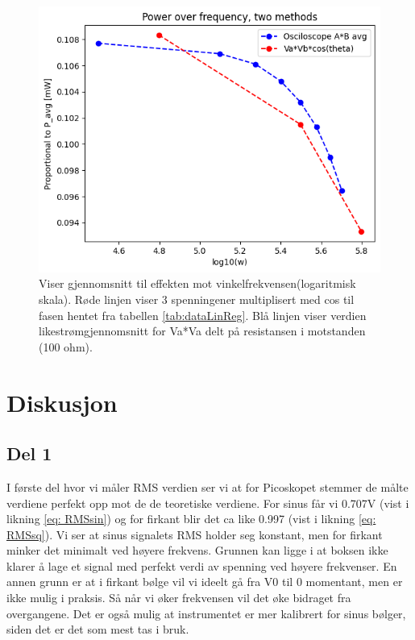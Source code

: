 \documentclass[norsk,a4paper,12pt]{article}
\begin{document}
\begin{figure}[htbp]
    \centering
    \includegraphics[width=1\textwidth]{Figs/effektavsettning.png}
    \caption{Viser gjennomsnitt til effekten mot vinkelfrekvensen(logaritmisk skala). Røde linjen viser 3 spenningener multiplisert med cos til fasen hentet fra tabellen \ref{tab:dataLinReg}. Blå linjen viser verdien likestrømgjennomsnitt for Va*Va delt på resistansen i motstanden (100 ohm).}
    \label{fig:effekt}
\end{figure}



\section{Diskusjon}
\subsection{Del 1}
I første del hvor vi måler RMS verdien ser vi at for Picoskopet stemmer de målte verdiene perfekt opp mot de de teoretiske verdiene. For sinus får vi 0.707V (vist i likning \ref{eq: RMSsin}) og for firkant blir det ca like 0.997 (vist i likning \ref{eq: RMSsq}). Vi ser at sinus signalets RMS holder seg konstant, men for firkant minker det minimalt ved høyere frekvens. Grunnen kan ligge i at boksen ikke klarer å lage et signal med perfekt verdi av spenning ved høyere frekvenser. En annen grunn er at i firkant bølge vil vi ideelt gå fra V0 til 0 momentant, men er ikke mulig i praksis. Så når vi øker frekvensen vil det øke bidraget fra overgangene. Det er også mulig at instrumentet er mer kalibrert for sinus bølger, siden det er det som mest tas i bruk.
\end{document}
